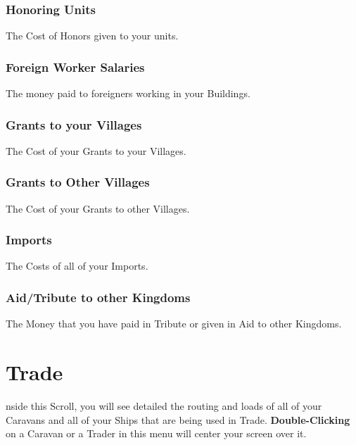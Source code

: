 \subsubsection{Honoring Units}

The Cost of Honors given to your units.

\subsubsection{Foreign Worker Salaries}

The money paid to foreigners working in your Buildings.

\subsubsection{Grants to your Villages}

The Cost of your Grants to your Villages.

\subsubsection{Grants to Other Villages}

The Cost of your Grants to other Villages.

\subsubsection{Imports}

The Costs of all of your Imports.

\subsubsection{Aid/Tribute to other Kingdoms}

The Money that you have paid in Tribute or given in Aid to other Kingdoms.

\section{Trade}



nside this Scroll, you will see detailed the routing and loads of all of your Caravans and all of your Ships that are being used in Trade. \textbf{Double-Clicking} on a Caravan or a Trader in this menu will center your screen over it.

